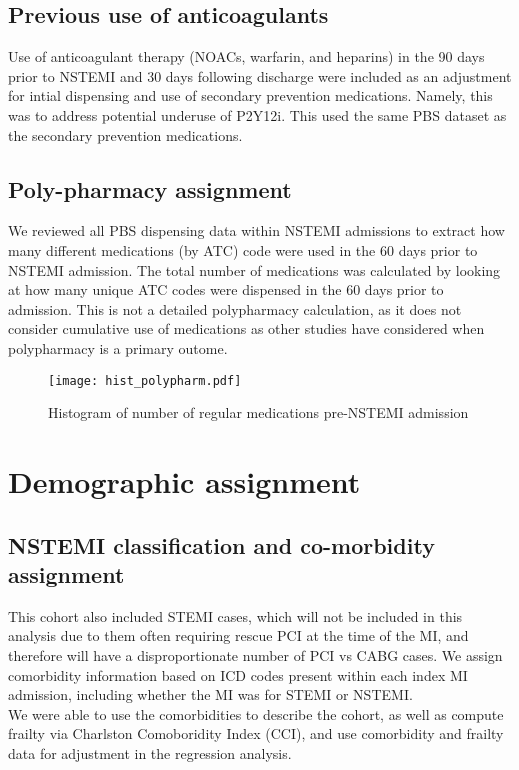 \documentclass[11pt]{article}
\begin{document}
\subsection{Previous use of anticoagulants}
Use of anticoagulant therapy (NOACs, warfarin, and heparins) in the 90 days prior to NSTEMI and 30 days following discharge were included as an adjustment for intial dispensing and use of secondary prevention medications. Namely, this was to address potential underuse of P2Y12i. This used the same PBS dataset as the secondary prevention medications.
\color{violet}
\begin{stlog}\end{stlog}
\color{black}
\pagebreak
\subsection{Poly-pharmacy assignment}
We reviewed all PBS dispensing data within NSTEMI admissions to extract how many different medications (by ATC) code were used in the 60 days prior to NSTEMI admission. The total number of medications was calculated by looking at how many unique ATC codes were dispensed in the 60 days prior to admission. This is not a detailed polypharmacy calculation, as it does not consider cumulative use of medications as other studies have considered when polypharmacy is a primary outome. \cite{polypharmacy2017} 
\color{violet}
\begin{stlog}\end{stlog}
\color{black}
\begin{figure} [h]
	\centering
	\texttt{[image: hist\_polypharm.pdf]}
	\caption{Histogram of number of regular medications pre-NSTEMI admission}
	\label{hist_polypharm}
\end{figure}


\color{black}
\pagebreak
\section{Demographic assignment}
\subsection{NSTEMI classification and co-morbidity assignment}
This cohort also included STEMI cases, which will not be included in this analysis due to them often requiring rescue PCI at the time of the MI, and therefore will have a disproportionate number of PCI vs CABG cases.\cite{takeji2021} We assign comorbidity information based on ICD codes present within each index MI admission, including whether the MI was for STEMI or NSTEMI. \\
We were able to use the comorbidities to describe the cohort, as well as compute frailty via Charlston Comoboridity Index (CCI)\cite{icdadmin}, and use comorbidity and frailty data for adjustment in the regression analysis. \\
\color{violet}
\begin{stlog}\end{stlog}
\color{black}
\pagebreak
\end{document}
